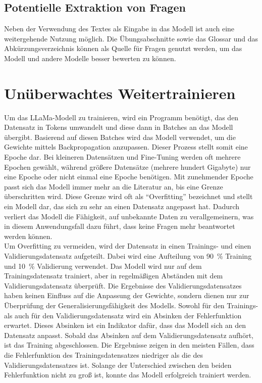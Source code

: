 \subsection{Potentielle Extraktion von Fragen}
Neben der Verwendung des Textes als Eingabe in das Modell ist auch eine weitergehende Nutzung möglich.
Die Übungsabschnitte sowie das Glossar und das Abkürzungsverzeichnis können als Quelle für Fragen genutzt werden,
um das Modell und andere Modelle besser bewerten zu können.

\section{Unüberwachtes Weitertrainieren}
Um das LLaMa-Modell zu trainieren, wird ein Programm benötigt, das den Datensatz in Tokens umwandelt und diese dann in Batches an das Modell übergibt.
Basierend auf diesen Batches wird das Modell verwendet, um die Gewichte mittels Backpropagation anzupassen.
Dieser Prozess stellt somit eine Epoche dar.
Bei kleineren Datensätzen und Fine-Tuning werden oft mehrere Epochen gewählt, während größere Datensätze (mehrere hundert Gigabyte) nur eine Epoche oder nicht einmal eine Epoche benötigen.
Mit zunehmender Epoche passt sich das Modell immer mehr an die Literatur an, bis eine Grenze überschritten wird.
Diese Grenze wird oft als \enquote{Overfitting} bezeichnet und stellt ein Modell dar, das sich zu sehr an einen Datensatz angepasst hat.
Dadurch verliert das Modell die Fähigkeit, auf unbekannte Daten zu verallgemeinern, was in diesem Anwendungsfall dazu führt, dass keine Fragen mehr beantwortet werden können.\\

Um Overfitting zu vermeiden, wird der Datensatz in einen Trainings- und einen Validierungsdatensatz aufgeteilt.
Dabei wird eine Aufteilung von \SI{90}{\percent} Training und \SI{10}{\percent} Validierung verwendet.
Das Modell wird nur auf dem Trainingsdatensatz trainiert, aber in regelmäßigen Abständen mit dem Validierungsdatensatz überprüft.
Die Ergebnisse des Validierungsdatensatzes haben keinen Einfluss auf die Anpassung der Gewichte, sondern dienen nur zur Überprüfung der Generalisierungsfähigkeit des Modells.
Sowohl für den Trainings- als auch für den Validierungsdatensatz wird ein Absinken der Fehlerfunktion erwartet.
Dieses Absinken ist ein Indikator dafür, dass das Modell sich an den Datensatz anpasst.
Sobald das Absinken auf dem Validierungsdatensatz aufhört, ist das Training abgeschlossen.
Die Ergebnisse zeigen in den meisten Fällen, dass die Fehlerfunktion des Trainingsdatensatzes niedriger als die des Validierungsdatensatzes ist.
Solange der Unterschied zwischen den beiden Fehlerfunktion nicht zu groß ist, konnte das Modell erfolgreich trainiert werden.\\

